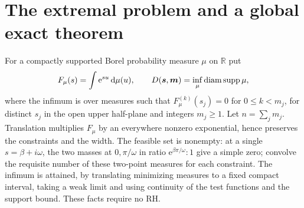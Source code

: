 \documentclass[11pt]{article}
\theoremstyle{remark}\newtheorem{remark}[theorem]{Remark}
\newcommand{\R}{\mathbb R}\newcommand{\C}{\mathbb C}\newcommand{\supp}{\operatorname{supp}}
\newcommand{\e}{\mathrm e}\newcommand{\norm}[1]{\left\|#1\right\|}
\begin{document}
\section{The extremal problem and a global exact theorem}
For a compactly supported Borel probability measure $\mu$ on $\R$ put
\[
 F_\mu(s)=\int\e^{su}\dd\mu(u),\qquad
 D(\boldsymbol{s},\boldsymbol{m})=\inf_\mu\diam\supp\mu,
\]
where the infimum is over measures such that $F_\mu^{(k)}(s_j)=0$ for $0\le k<m_j$, for distinct $s_j$ in the open upper half-plane and integers $m_j\ge1$. Let $n=\sum_j m_j$. Translation multiplies $F_\mu$ by an everywhere nonzero exponential, hence preserves the constraints and the width. The feasible set is nonempty: at a single $s=\beta+i\omega$, the two masses at $0,\pi/\omega$ in ratio $\e^{\beta\pi/\omega}:1$ give a simple zero; convolve the requisite number of these two-point measures for each constraint. The infimum is attained, by translating minimizing measures to a fixed compact interval, taking a weak limit and using continuity of the test functions and the support bound. These facts require no RH.
\end{document}
